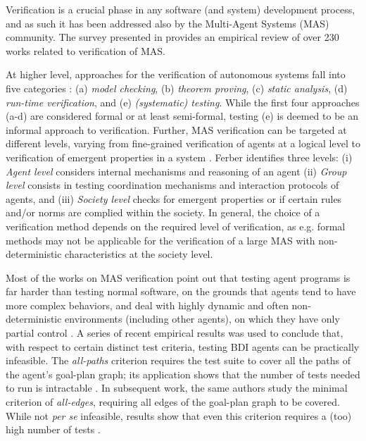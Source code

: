 Verification is a crucial phase in any software (and system) development process, and as such it has been  addressed also by the Multi-Agent Systems (MAS) community. The survey presented in \cite{Bakar2018} provides an empirical review of over 230 works related to verification of MAS. 

At higher level,  approaches for the verification of autonomous systems fall into five categories \cite{Fisher2020}: (a) \textit{model checking}, (b) \textit{theorem proving}, (c) \textit{static analysis}, (d) \textit{run-time verification}, and (e) \textit{(systematic) testing}. While the first four approaches (a-d) are considered formal or at least semi-formal, testing (e) is deemed to be an informal approach to verification. 
Further, MAS verification can be targeted at different levels, varying from fine-grained verification of agents at a logical level  \cite{Behrens2007} to verification of emergent properties in a system \cite{David2003}. Ferber \cite{MAS_Intro} identifies three levels: (i) \textit{Agent level} considers internal mechanisms and reasoning of an agent (ii) \textit{Group level} consists in testing coordination mechanisms and interaction protocols of agents, and (iii) \textit{Society level} checks for emergent properties or if certain rules and/or norms are complied within the society. In general, the choice of a verification method depends on the required level of verification, as e.g. formal methods may not be applicable for the verification of a large MAS with non-deterministic characteristics at the society level.

Most of the works on MAS verification point out that testing agent programs is far harder than testing normal software, on the grounds that agents tend to have more complex behaviors, and deal with highly dynamic and often non-deterministic environments (including other agents), on which they have only partial control \cite{Nguyen2011}. A series of recent empirical results \cite{Winikoff2015,Winikoff2017} was used to conclude that, with respect to certain distinct test criteria, testing BDI agents can be practically infeasible. The \textit{all-paths} criterion requires the test suite to cover all the paths of the agent's goal-plan graph; its application shows that the number of tests needed to run is intractable \cite{Winikoff2015}. In subsequent work, the same authors study the minimal criterion of \textit{all-edges}, requiring all edges of the goal-plan graph to be covered.
While not \textit{per se} infeasible,
results show that even this criterion requires a (too) high number of tests \cite{Winikoff2017}.

